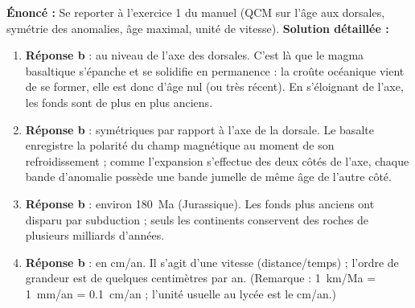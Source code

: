 \documentclass[11pt]{article}
\begin{document}
\begin{corrige}
\textbf{Énoncé :} Se reporter à l'exercice 1 du manuel (QCM sur l'âge aux dorsales, symétrie des anomalies, âge maximal, unité de vitesse).
\tcblower
\textbf{Solution détaillée :}
\begin{enumerate}
\item \textbf{Réponse b} : au niveau de l'axe des dorsales. C'est là que le magma basaltique s'épanche et se solidifie en permanence : la croûte océanique vient de se former, elle est donc d'âge nul (ou très récent). En s'éloignant de l'axe, les fonds sont de plus en plus anciens.
\item \textbf{Réponse b} : symétriques par rapport à l'axe de la dorsale. Le basalte enregistre la polarité du champ magnétique au moment de son refroidissement ; comme l'expansion s'effectue des deux côtés de l'axe, chaque bande d'anomalie possède une bande jumelle de même âge de l'autre côté.
\item \textbf{Réponse b} : environ \SI{180}{Ma} (Jurassique). Les fonds plus anciens ont disparu par subduction ; seuls les continents conservent des roches de plusieurs milliards d'années.
\item \textbf{Réponse b} : en cm/an. Il s'agit d'une vitesse (distance/temps) ; l'ordre de grandeur est de quelques centimètres par an. (Remarque : \SI{1}{km/Ma} = \SI{1}{mm/an} = \SI{0,1}{cm/an} ; l'unité usuelle au lycée est le cm/an.)
\end{enumerate}
\end{corrige}
\end{document}
